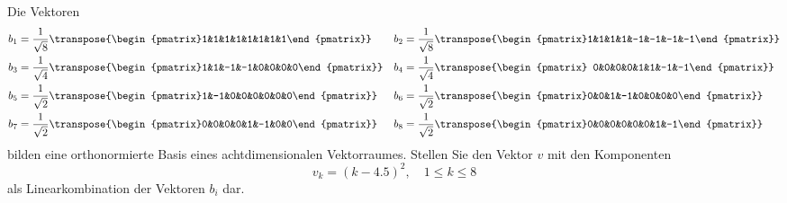 Die Vektoren
\begin{align*}
b_1&=\frac1{\sqrt{8}} \transpose{\begin{pmatrix}1&1&1&1&1&1&1&1\end{pmatrix}}&
b_2&=\frac1{\sqrt{8}} \transpose{\begin{pmatrix}1&1&1&1&-1&-1&-1&-1\end{pmatrix}}\\
b_3&=\frac1{\sqrt{4}} \transpose{\begin{pmatrix}1&1&-1&-1&0&0&0&0\end{pmatrix}}&
b_4&=\frac1{\sqrt{4}} \transpose{\begin{pmatrix} 0&0&0&0&1&1&-1&-1\end{pmatrix}}\\
b_5&=\frac1{\sqrt{2}} \transpose{\begin{pmatrix}1&-1&0&0&0&0&0&0\end{pmatrix}}&
b_6&=\frac1{\sqrt{2}} \transpose{\begin{pmatrix}0&0&1&-1&0&0&0&0\end{pmatrix}}\\
b_7&=\frac1{\sqrt{2}} \transpose{\begin{pmatrix}0&0&0&0&1&-1&0&0\end{pmatrix}}&
b_8&=\frac1{\sqrt{2}} \transpose{\begin{pmatrix}0&0&0&0&0&0&1&-1\end{pmatrix}}
\end{align*}
bilden eine orthonormierte Basis eines achtdimensionalen Vektorraumes.
Stellen Sie den Vektor $v$ mit den Komponenten
\[
v_k=(k-4.5)^2,\quad{1\le k\le 8}
\]
als Linearkombination der Vektoren $b_i$ dar.


